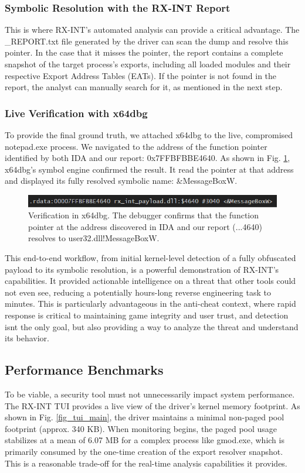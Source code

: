 \documentclass[journal]{IEEEtran}
\begin{document}
\subsubsection{Symbolic Resolution with the RX-INT Report}
This is where RX-INT's automated analysis can provide a critical advantage. The \_REPORT.txt file generated by the driver can scan the dump and resolve this pointer. In the case that it misses the pointer, the report contains a complete snapshot of the target process's exports, including all loaded modules and their respective Export Address Tables (EATs). If the pointer is not found in the report, the analyst can manually search for it, as mentioned in the next step.
\subsubsection{Live Verification with x64dbg}
To provide the final ground truth, we attached x64dbg to the live, compromised notepad.exe process. We navigated to the address of the function pointer identified by both IDA and our report: 0x7FFBFBBE4640. As shown in Fig. \ref{fig_x64dbg}, x64dbg's symbol engine confirmed the result. It read the pointer at that address and displayed its fully resolved symbolic name: \&MessageBoxW.
\begin{figure}[!t]
\centering
\includegraphics[width=\columnwidth]{figures/x64dbg_resolve.png}
\caption{Verification in x64dbg. The debugger confirms that the function pointer at the address discovered in IDA and our report (...4640) resolves to user32.dll!MessageBoxW.}
\label{fig_x64dbg}
\end{figure}
This end-to-end workflow, from initial kernel-level detection of a fully obfuscated payload to its symbolic resolution, is a powerful demonstration of RX-INT's capabilities. It provided actionable intelligence on a threat that other tools could not even see, reducing a potentially hours-long reverse engineering task to minutes. This is particularly advantageous in the anti-cheat context, where rapid response is critical to maintaining game integrity and user trust, and detection isnt the only goal, but also providing a way to analyze the threat and understand its behavior.

\subsection{Performance Benchmarks}
To be viable, a security tool must not unnecessarily impact system performance. The RX-INT TUI provides a live view of the driver's kernel memory footprint. As shown in Fig. \ref{fig_tui_main}, the driver maintains a minimal non-paged pool footprint (approx. 340 KB). When monitoring begins, the paged pool usage stabilizes at a mean of 6.07 MB for a complex process like gmod.exe, which is primarily consumed by the one-time creation of the export resolver snapshot. This is a reasonable trade-off for the real-time analysis capabilities it provides.
\end{document}
